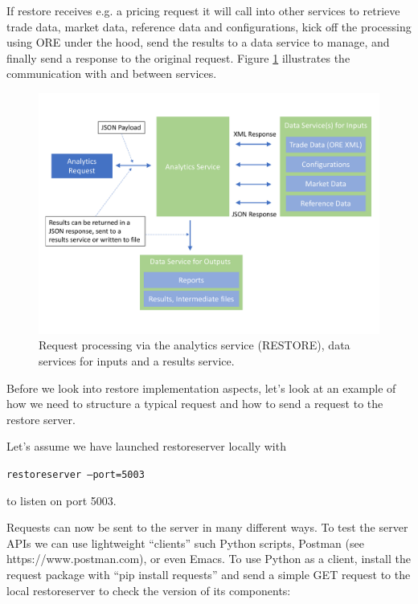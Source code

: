 \documentclass[12pt, a4paper]{report}
\begin{document}
If restore receives e.g. a pricing request it will call into other services to retrieve trade data,
market data, reference data and configurations, kick off the processing using ORE under
the hood, send the results to a data service to manage, and finally send a response to the original request. 
Figure \ref{fig:services} illustrates the communication with and between services.

\begin{figure}[h]
\begin{center}
\includegraphics[scale=0.4]{data/services.pdf}
\end{center}
\caption{Request processing via the analytics service (RESTORE), data services for inputs and a
  results service.}
\label{fig:services}
\end{figure}

Before we look into restore implementation aspects, let's look at an example of how we need to structure a
typical request and how to send a request to the restore server.

Let's assume we have launched restoreserver locally with

\medskip
\centerline{\tt restoreserver ---port=5003}

to listen on port 5003.

Requests can now be sent to the server in many different ways. To test the server APIs we can use
lightweight ``clients'' such Python scripts, Postman (see https://www.postman.com), or even Emacs.
To use Python as a client, install the request package with ``pip install requests'' and send a simple
GET request to the local restoreserver to check the version of its components:
\end{document}
